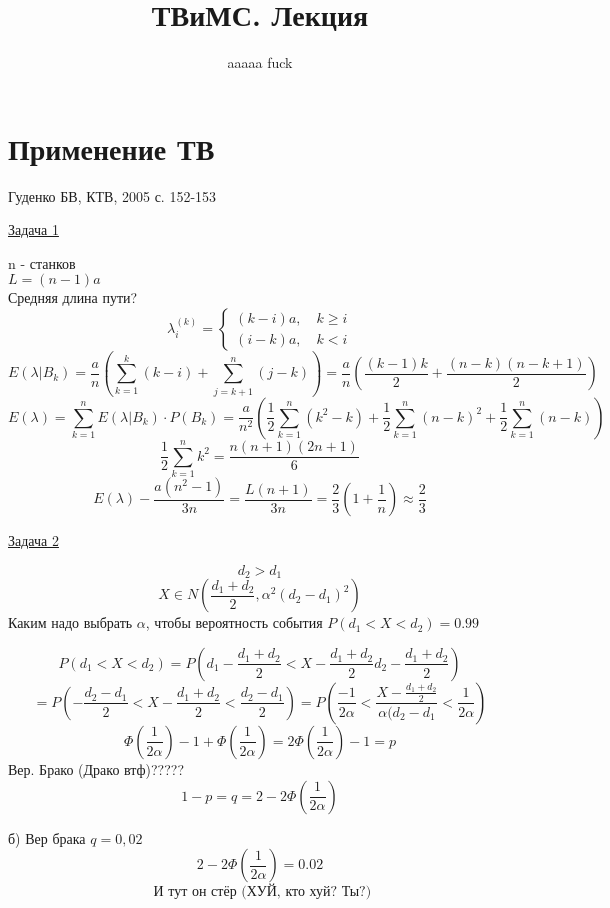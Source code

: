 \documentclass[a4paper]{article}
\begin{document}
\title{ТВиМС. Лекция}
\author{aaaaa fuck}
\maketitle

\section*{\centering Применение ТВ}
Гуденко БВ, КТВ, 2005 с. 152-153

\underline{Задача 1}

n - станков\\
$ L = (n-1)a $ \\
Средняя длина пути?
\[
    \lambda_{i}^{(k)}  =
    \begin{cases}
        (k-i)a, \quad k \geq i\\
        (i-k)a, \quad k < i
    \end{cases}
\]
\[
    E(\lambda | B_k) = \frac{a}{n} \left( \sum_{k=1}^{k} (k-i) + 
    \sum_{j = k + 1}^{n} (j-k) \right) = \frac{a}{n} \left( \frac{(k-1)k}{2} 
    + \frac{(n-k)(n-k+1)}{2} \right)
\]
\[
    E(\lambda) = \sum_{k=1}^{n} E(\lambda | B_k) \cdot P(B_k) = 
    \frac{a}{n^2} \left(\frac{1}{2} \sum_{k=1}^{n} (k^2 - k) + \frac{1}{2} \sum_{k=1}^{n}
        (n - k)^2 + \frac{1}{2} \sum_{k=1}^{n} (n-k) \right)
\]
\[
    \frac{1}{2} \sum_{k=1}^{n} k^2 = \frac{n(n+1)(2n+1)}{6} 
\]
\[
    E(\lambda) - \frac{a (n^2 - 1)}{3n} = \frac{L(n+1)}{3n} = \frac{2}{3} 
    \left(1 + \frac{1}{n}\right) \approx \frac{2}{3} 
\]

\underline{Задача 2}

\[
    d_2 > d_1
\]
\[
    X \in N\left(\frac{d_1 + d_2}{2}, \alpha^2(d_2 - d_1)^2\right)
\]
Каким надо выбрать $ \alpha $, чтобы вероятность события $ P(d_1 < X < d_2) = 0.99 $ 

\[
     P(d_1 < X < d_2) = P\left(d_1  - \frac{d_1 + d_2}{2} < X - \frac{d_1 + d_2}{2}
    d_2  - \frac{d_1 + d_2}{2}\right)
\]
\[
     = P\left( -\frac{d_2 - d_1}{2} < X - \frac{d_1+d_2}{2}  
    < \frac{d_2 - d_1}{2}\right) = P \left( \frac{-1}{2 \alpha} < 
    \frac{X - \frac{d_1+d_2}{2} }{\alpha(d_2 - d_1} < \frac{1}{2 \alpha} \right)
\]
\[
    \Phi(\frac{1}{2 \alpha} ) - 1 + \Phi(\frac{1}{2 \alpha} ) = 
    2 \Phi(\frac{1}{2 \alpha} ) - 1 = p
\]
Вер. Брако (Драко втф)?????
\[
    1 - p = q = 2 - 2 \Phi\left(\frac{1}{2 \alpha} \right)
\]

б) Вер брака $ q = 0,02 $ 
\[
    2 - 2 \Phi \left( \frac{1}{2 \alpha} \right) = 0.02
\]
\[
    \text{ И тут он стёр (ХУЙ, кто хуй? Ты?)}
\]
\end{document}
